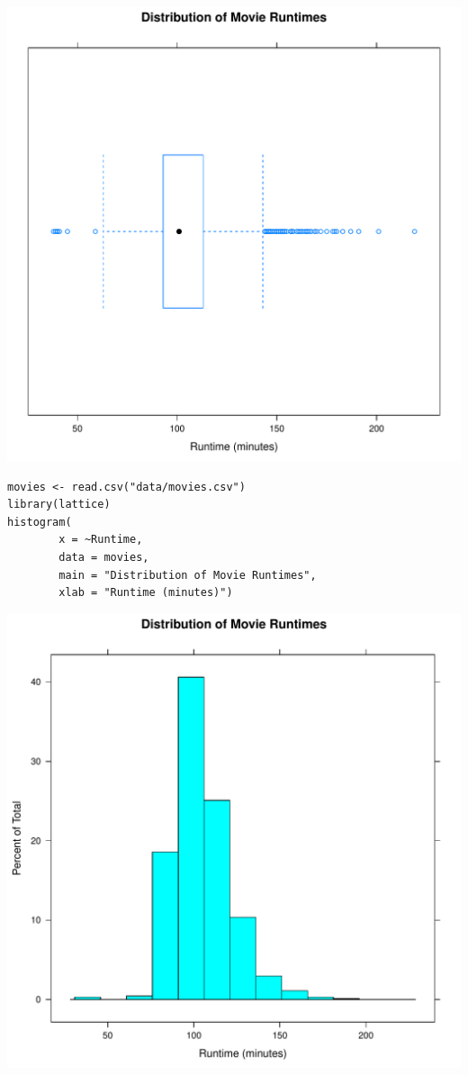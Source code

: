 \documentclass[a4paper, captions=tableheading]{tufte-book}
\begin{document}
\includegraphics[width=.9\linewidth]{img/1-num-lattice-02.pdf}

\begin{verbatim}
movies <- read.csv("data/movies.csv")
library(lattice)
histogram(
		x = ~Runtime,
		data = movies,
		main = "Distribution of Movie Runtimes",
		xlab = "Runtime (minutes)")
\end{verbatim}

\includegraphics[width=.9\linewidth]{img/1-num-lattice-03.pdf}
\end{document}
